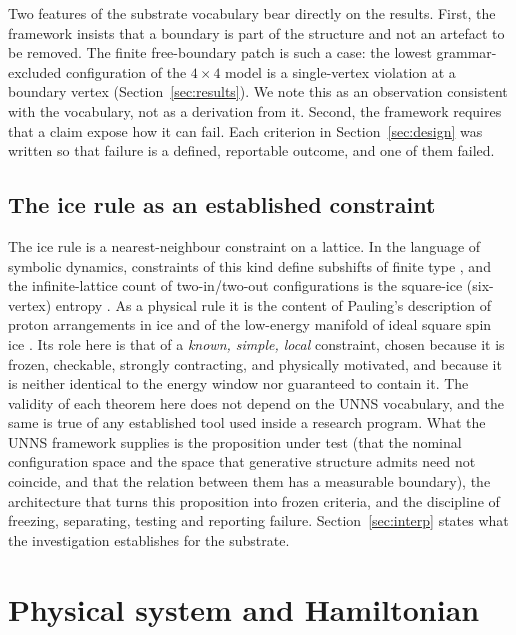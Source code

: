 \documentclass[11pt,a4paper]{article}
\theoremstyle{plain}
\theoremstyle{definition}
\theoremstyle{remark}
\begin{document}
Two features of the substrate vocabulary bear directly on the results. First, the framework insists that a boundary is part of the structure and not an artefact to be removed. The finite free-boundary patch is such a case: the lowest grammar-excluded configuration of the $4\times4$ model is a single-vertex violation at a boundary vertex (Section~\ref{sec:results}). We note this as an observation consistent with the vocabulary, not as a derivation from it. Second, the framework requires that a claim expose how it can fail. Each criterion in Section~\ref{sec:design} was written so that failure is a defined, reportable outcome, and one of them failed.

\subsection{The ice rule as an established constraint}
The ice rule is a nearest-neighbour constraint on a lattice. In the language of symbolic dynamics, constraints of this kind define subshifts of finite type \cite{LindMarcus1995}, and the infinite-lattice count of two-in/two-out configurations is the square-ice (six-vertex) entropy \cite{Lieb1967}. As a physical rule it is the content of Pauling's description of proton arrangements in ice \cite{Pauling1935,BernalFowler1933} and of the low-energy manifold of ideal square spin ice \cite{Nisoli2013}. Its role here is that of a \emph{known, simple, local} constraint, chosen because it is frozen, checkable, strongly contracting, and physically motivated, and because it is neither identical to the energy window nor guaranteed to contain it. The validity of each theorem here does not depend on the UNNS vocabulary, and the same is true of any established tool used inside a research program. What the UNNS framework supplies is the proposition under test (that the nominal configuration space and the space that generative structure admits need not coincide, and that the relation between them has a measurable boundary), the architecture that turns this proposition into frozen criteria, and the discipline of freezing, separating, testing and reporting failure. Section~\ref{sec:interp} states what the investigation establishes for the substrate.

\section{Physical system and Hamiltonian}\label{sec:system}
\end{document}
